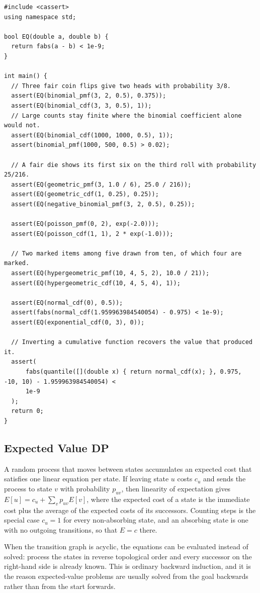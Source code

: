 \begin{lstlisting}[style=cpp]
#include <cassert>
using namespace std;

bool EQ(double a, double b) {
  return fabs(a - b) < 1e-9;
}

int main() {
  // Three fair coin flips give two heads with probability 3/8.
  assert(EQ(binomial_pmf(3, 2, 0.5), 0.375));
  assert(EQ(binomial_cdf(3, 3, 0.5), 1));
  // Large counts stay finite where the binomial coefficient alone would not.
  assert(EQ(binomial_cdf(1000, 1000, 0.5), 1));
  assert(binomial_pmf(1000, 500, 0.5) > 0.02);

  // A fair die shows its first six on the third roll with probability 25/216.
  assert(EQ(geometric_pmf(3, 1.0 / 6), 25.0 / 216));
  assert(EQ(geometric_cdf(1, 0.25), 0.25));
  assert(EQ(negative_binomial_pmf(3, 2, 0.5), 0.25));

  assert(EQ(poisson_pmf(0, 2), exp(-2.0)));
  assert(EQ(poisson_cdf(1, 1), 2 * exp(-1.0)));

  // Two marked items among five drawn from ten, of which four are marked.
  assert(EQ(hypergeometric_pmf(10, 4, 5, 2), 10.0 / 21));
  assert(EQ(hypergeometric_cdf(10, 4, 5, 4), 1));

  assert(EQ(normal_cdf(0), 0.5));
  assert(fabs(normal_cdf(1.959963984540054) - 0.975) < 1e-9);
  assert(EQ(exponential_cdf(0, 3), 0));

  // Inverting a cumulative function recovers the value that produced it.
  assert(
      fabs(quantile([](double x) { return normal_cdf(x); }, 0.975, -10, 10) - 1.959963984540054) <
      1e-9
  );
  return 0;
}
\end{lstlisting}
\subsection{Expected Value DP}
\label{sec:6.7.2}
A random process that moves between states accumulates an expected cost that satisfies one linear equation per state. If leaving state $u$ costs $c_u$ and sends the process to state $v$ with probability $p_{uv}$, then linearity of expectation gives $E[u] = c_u + \sum_v p_{uv} E[v]$, where the expected cost of a state is the immediate cost plus the average of the expected costs of its successors. Counting steps is the special case $c_u = 1$ for every non-absorbing state, and an absorbing state is one with no outgoing transitions, so that $E = c$ there.

When the transition graph is acyclic, the equations can be evaluated instead of solved: process the states in reverse topological order and every successor on the right-hand side is already known. This is ordinary backward induction, and it is the reason expected-value problems are usually solved from the goal backwards rather than from the start forwards.

